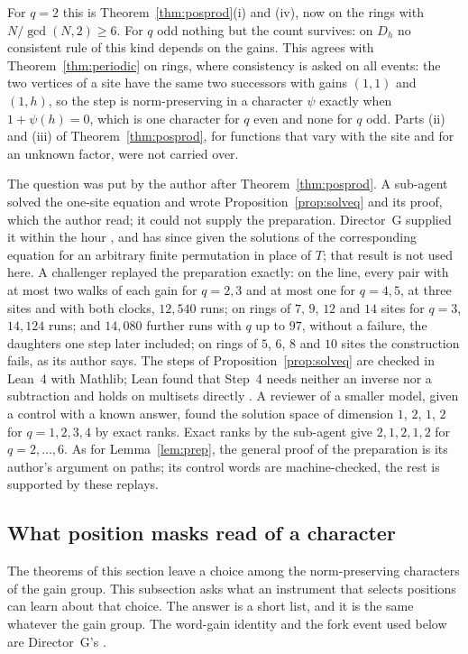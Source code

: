 For $q=2$ this is Theorem~\ref{thm:posprod}(i) and (iv), now on the rings with $N/\gcd(N,2)\ge6$. For $q$ odd nothing but the count survives: on $D_h$ no consistent rule of this kind depends on the gains. This agrees with Theorem~\ref{thm:periodic} on rings, where consistency is asked on all events: the two vertices of a site have the same two successors with gains $(1,1)$ and $(1,h)$, so the step is norm-preserving in a character $\psi$ exactly when $1+\psi(h)=0$, which is one character for $q$ even and none for $q$ odd. Parts (ii) and (iii) of Theorem~\ref{thm:posprod}, for functions that vary with the site and for an unknown factor, were not carried over.

The question was put by the author after Theorem~\ref{thm:posprod}. A sub-agent solved the one-site equation and wrote Proposition~\ref{prop:solveq} and its proof, which the author read; it could not supply the preparation. Director~G supplied it within the hour \cite{dgone}, and has since given the solutions of the corresponding equation for an arbitrary finite permutation in place of $T$; that result is not used here. A challenger replayed the preparation exactly: on the line, every pair with at most two walks of each gain for $q=2,3$ and at most one for $q=4,5$, at three sites and with both clocks, $12{,}540$ runs; on rings of $7$, $9$, $12$ and $14$ sites for $q=3$, $14{,}124$ runs; and $14{,}080$ further runs with $q$ up to $97$, without a failure, the daughters one step later included; on rings of $5$, $6$, $8$ and $10$ sites the construction fails, as its author says. The steps of Proposition~\ref{prop:solveq} are checked in Lean~4 with Mathlib; Lean found that Step~4 needs neither an inverse nor a subtraction and holds on multisets directly \cite{comp4s}. A reviewer of a smaller model, given a control with a known answer, found the solution space of dimension $1$, $2$, $1$, $2$ for $q=1,2,3,4$ by exact ranks. Exact ranks by the sub-agent give $2,1,2,1,2$ for $q=2,\dots,6$. As for Lemma~\ref{lem:prep}, the general proof of the preparation is its author's argument on paths; its control words are machine-checked, the rest is supported by these replays.

\subsection{What position masks read of a character}

The theorems of this section leave a choice among the norm-preserving characters of the gain group. This subsection asks what an instrument that selects positions can learn about that choice. The answer is a short list, and it is the same whatever the gain group. The word-gain identity and the fork event used below are Director~G's \cite{dgfour}.


